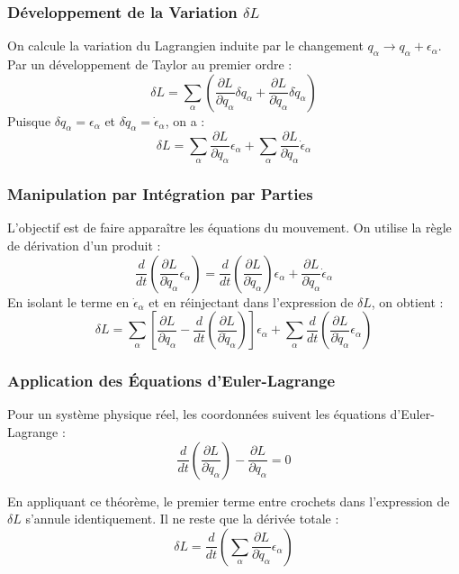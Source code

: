 \documentclass[french]{yLectureNote}
\begin{document}
\subsubsection{Développement de la Variation $\delta L$}
On calcule la variation du Lagrangien induite par le changement $q_\alpha \to q_\alpha + \epsilon_\alpha$. Par un développement de Taylor au premier ordre :
$$\delta L = \sum_\alpha \left( \frac{\partial L}{\partial q_\alpha}\delta q_\alpha + \frac{\partial L}{\partial \dot{q}_\alpha}\delta \dot{q}_\alpha \right)$$
Puisque $\delta q_\alpha = \epsilon_\alpha$ et $\delta \dot{q}_\alpha = \dot{\epsilon}_\alpha$, on a :
$$\delta L = \sum_\alpha \frac{\partial L}{\partial q_\alpha}\epsilon_\alpha + \sum_\alpha \frac{\partial L}{\partial \dot{q}_\alpha}\dot{\epsilon}_\alpha$$

\subsubsection{Manipulation par Intégration par Parties}
L'objectif est de faire apparaître les équations du mouvement. On utilise la règle de dérivation d'un produit :
$$\frac{d}{dt} \left( \frac{\partial L}{\partial \dot{q}_\alpha} \epsilon_\alpha \right) = \frac{d}{dt} \left( \frac{\partial L}{\partial \dot{q}_\alpha} \right) \epsilon_\alpha + \frac{\partial L}{\partial \dot{q}_\alpha} \dot{\epsilon}_\alpha$$
En isolant le terme en $\dot{\epsilon}_\alpha$ et en réinjectant dans l'expression de $\delta L$, on obtient :
$$\delta L = \sum_\alpha \left[ \frac{\partial L}{\partial q_\alpha} - \frac{d}{dt} \left( \frac{\partial L}{\partial \dot{q}_\alpha} \right) \right] \epsilon_\alpha + \sum_\alpha \frac{d}{dt} \left( \frac{\partial L}{\partial \dot{q}_\alpha} \epsilon_\alpha \right)$$

\subsubsection{Application des Équations d'Euler-Lagrange}

Pour un système physique réel, les coordonnées suivent les équations d'Euler-Lagrange :
$$\frac{d}{dt} \left( \frac{\partial L}{\partial \dot{q}_\alpha} \right) - \frac{\partial L}{\partial q_\alpha} = 0$$


En appliquant ce théorème, le premier terme entre crochets dans l'expression de $\delta L$ s'annule identiquement. Il ne reste que la dérivée totale :
$$\delta L = \frac{d}{dt} \left( \sum_\alpha \frac{\partial L}{\partial \dot{q}_\alpha} \epsilon_\alpha \right)$$
\end{document}
